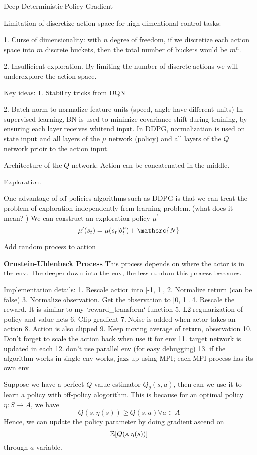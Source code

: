 \documentclass{article}
\begin{document}
Deep Deterministic Policy Gradient

Limitation of discretize action space for high dimentional control tasks:

1. Curse of dimensionality: with $n$ degree of freedom, if we discretize
each action space into $m$ discrete buckets, then the total number of 
buckets would be $m^n$.

2. Insufficient exploration. By limiting the number of discrete actions
we will underexplore the action space. 


Key ideas:
1. Stability tricks from DQN

2. Batch norm to normalize feature units (speed, angle have different 
units)
In supervised learning, BN is used to minimize covariance shift during 
training, by ensuring each layer receives whitend input. 
In DDPG, normalization is used on state input and all layers of the 
$\mu$ network (policy) and all layers of the $Q$ network prioir to 
the action input. 

Architecture of the $Q$ network:
Action can be concatenated in the middle. 

Exploration:

One advantage of off-policies algorithms such as DDPG is that we can treat 
the problem of exploration independently from learning problem. (what does 
it mean? )
We can construct an exploration policy $\mu^{\prime}$ 
\[
    \mu^{\prime}(s_t) = \mu(s_t | \theta^{\mu}_t) + \mathsrc{N}
\]

Add random process to action

\textbf{Ornstein-Uhlenbeck Process} This process depends on where the actor
is in the env. The deeper down into the env, the less random this process
becomes. 

Implementation details:
1. Rescale action into [-1, 1], 
2. Normalize return (can be false)
3. Normalize observation. Get the observation to [0, 1].
4. Rescale the reward. It is similar to my `reward_transform` function
5. L2 regularization of policy and value nets
6. Clip gradient
7. Noise is added when actor takes an action
8. Action is also clipped
9. Keep moving average of return, observation
10. Don't forget to scale the action back when use it for env
11. target network is updated in each 
12. don't use parallel env (for easy debugging) 
13. if the algorithm works in single env works, jazz up using MPI; 
each MPI process has its own env

Suppose we have a perfect $Q$-value estimator $Q_{\theta}(s, a)$, then
can we use it to learn a policy with off-policy alogorithm. This is 
because for an optimal policy $\eta : S \rightarrow A$, we have 
\[
    Q(s, \eta(s)) \geq Q(s, a) \forall a \in A
\]
Hence, we can update the policy parameter by doing gradient ascend on
\[
    \mathbb{E}[Q(s, \eta(s))]
\]
through $a$ variable. 
\end{document}
